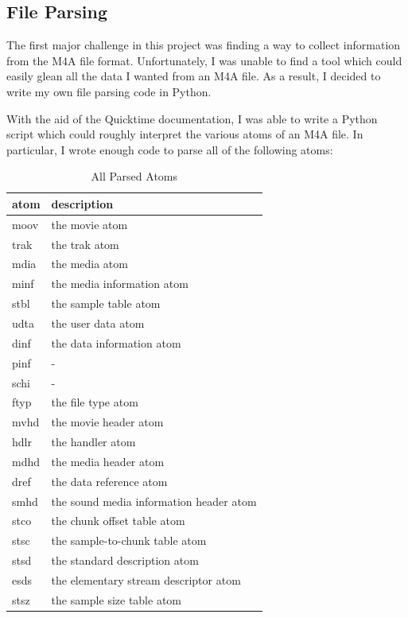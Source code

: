 \documentclass[journal]{vgtc}                %
\begin{document}
\subsection{File Parsing}

The first major challenge in this project was finding a way to collect
information from the M4A file format. Unfortunately, I was unable to find a
tool which could easily glean all the data I wanted from an M4A file. As a result,
I decided to write my own file parsing code in Python.

With the aid of the Quicktime documentation, I was able to write a Python script
which could roughly interpret the various atoms of an M4A file. In particular,
I wrote enough code to parse all of the following atoms:

\begin{table}[h]
  \caption{All Parsed Atoms}
  \label{tab:atoms}
  \scriptsize%
	\centering%
  \begin{tabu}{l l}
  \toprule
    atom & description \\
  \midrule
    moov & the movie atom \\
    trak & the trak atom \\
    mdia & the media atom \\
    minf & the media information atom \\
    stbl & the sample table atom \\
    udta & the user data atom \\
    dinf & the data information atom \\
    pinf & - \\
    schi & - \\
    ftyp & the file type atom \\
    mvhd & the movie header atom \\
    hdlr & the handler atom \\
    mdhd & the media header atom \\
    dref & the data reference atom \\
    smhd & the sound media information header atom \\
    stco & the chunk offset table atom \\
    stsc & the sample-to-chunk table atom \\
    stsd & the standard description atom \\
    esds & the elementary stream descriptor atom \\
    stsz & the sample size table atom \\

\end{tabu}
\end{table}
\end{document}
